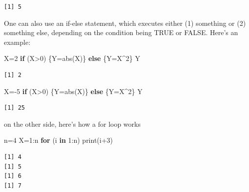 \documentclass[
  letterpaper,
  DIV=11,
  numbers=noendperiod]{scrartcl}
\newenvironment{Shaded}{\begin{snugshade}}{\end{snugshade}}
\newcommand{\ControlFlowTok}[1]{\textcolor[rgb]{0.00,0.23,0.31}{\textbf{#1}}}
\newcommand{\DecValTok}[1]{\textcolor[rgb]{0.68,0.00,0.00}{#1}}
\newcommand{\FunctionTok}[1]{\textcolor[rgb]{0.28,0.35,0.67}{#1}}
\newcommand{\NormalTok}[1]{\textcolor[rgb]{0.00,0.23,0.31}{#1}}
\newcommand{\OtherTok}[1]{\textcolor[rgb]{0.00,0.23,0.31}{#1}}
\newcommand{\SpecialCharTok}[1]{\textcolor[rgb]{0.37,0.37,0.37}{#1}}
\begin{document}
\begin{verbatim}
[1] 5
\end{verbatim}

One can also use an if-else statement, which executes either (1)
something or (2) something else, depending on the condition being TRUE
or FALSE. Here's an example:

\begin{Shaded}
\begin{Highlighting}[]
\NormalTok{X}\OtherTok{=}\DecValTok{2}
\ControlFlowTok{if}\NormalTok{ (X}\SpecialCharTok{\textgreater{}}\DecValTok{0}\NormalTok{)}
\NormalTok{  \{Y}\OtherTok{=}\FunctionTok{abs}\NormalTok{(X)\} }\ControlFlowTok{else} 
\NormalTok{  \{Y}\OtherTok{=}\NormalTok{X}\SpecialCharTok{\^{}}\DecValTok{2}\NormalTok{\}}
\NormalTok{Y}
\end{Highlighting}
\end{Shaded}

\begin{verbatim}
[1] 2
\end{verbatim}

\begin{Shaded}
\begin{Highlighting}[]
\NormalTok{X}\OtherTok{=}\SpecialCharTok{{-}}\DecValTok{5}
\ControlFlowTok{if}\NormalTok{ (X}\SpecialCharTok{\textgreater{}}\DecValTok{0}\NormalTok{)}
\NormalTok{  \{Y}\OtherTok{=}\FunctionTok{abs}\NormalTok{(X)\} }\ControlFlowTok{else} 
\NormalTok{  \{Y}\OtherTok{=}\NormalTok{X}\SpecialCharTok{\^{}}\DecValTok{2}\NormalTok{\}}
\NormalTok{Y}
\end{Highlighting}
\end{Shaded}

\begin{verbatim}
[1] 25
\end{verbatim}

on the other side, here's how a for loop works

\begin{Shaded}
\begin{Highlighting}[]
\NormalTok{n}\OtherTok{=}\DecValTok{4}
\NormalTok{X}\OtherTok{=}\DecValTok{1}\SpecialCharTok{:}\NormalTok{n}
\ControlFlowTok{for}\NormalTok{ (i }\ControlFlowTok{in} \DecValTok{1}\SpecialCharTok{:}\NormalTok{n) }\FunctionTok{print}\NormalTok{(i}\SpecialCharTok{+}\DecValTok{3}\NormalTok{)}
\end{Highlighting}
\end{Shaded}

\begin{verbatim}
[1] 4
[1] 5
[1] 6
[1] 7
\end{verbatim}
\end{document}
